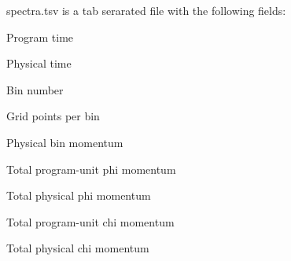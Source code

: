 spectra.tsv is a tab serarated file with the following fields:

\begin{DoxyItemize}
\item Program time \item Physical time \item Bin number \item Grid points per bin \item Physical bin momentum \item Total program-\/unit phi momentum \item Total physical phi momentum \item Total program-\/unit chi momentum \item Total physical chi momentum \end{DoxyItemize}
